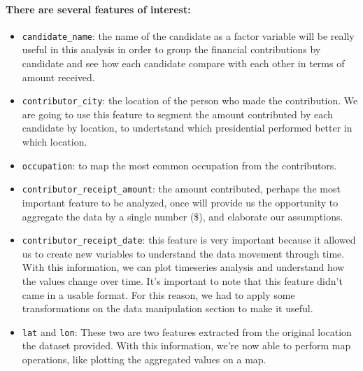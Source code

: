 \documentclass[]{article}
\providecommand{\tightlist}{%
  \setlength{\itemsep}{0pt}\setlength{\parskip}{0pt}}
\let\oldparagraph\paragraph
\renewcommand{\paragraph}[1]{\oldparagraph{#1}\mbox{}}
\begin{document}
\paragraph{There are several features of
interest:}\label{there-are-several-features-of-interest}

\begin{itemize}
\tightlist
\item
  \texttt{candidate\_name}: the name of the candidate as a factor
  variable will be really useful in this analysis in order to group the
  financial contributions by candidate and see how each candidate
  compare with each other in terms of amount received.
\item
  \texttt{contributor\_city}: the location of the person who made the
  contribution. We are going to use this feature to segment the amount
  contributed by each candidate by location, to undertstand which
  presidential performed better in which location.
\item
  \texttt{occupation}: to map the most common occupation from the
  contributors.
\item
  \texttt{contributor\_receipt\_amount}: the amount contributed, perhaps
  the most important feature to be analyzed, once will provide us the
  opportunity to aggregate the data by a single number (\$), and
  elaborate our assumptions.
\item
  \texttt{contributor\_receipt\_date}: this feature is very important
  because it allowed us to create new variables to understand the data
  movement through time. With this information, we can plot timeseries
  analysis and understand how the values change over time. It's
  important to note that this feature didn't came in a usable format.
  For this reason, we had to apply some transformations on the data
  manipulation section to make it useful.
\item
  \texttt{lat} and \texttt{lon}: These two are two features extracted
  from the original location the dataset provided. With this
  information, we're now able to perform map operations, like plotting
  the aggregated values on a map.
\end{itemize}
\end{document}
